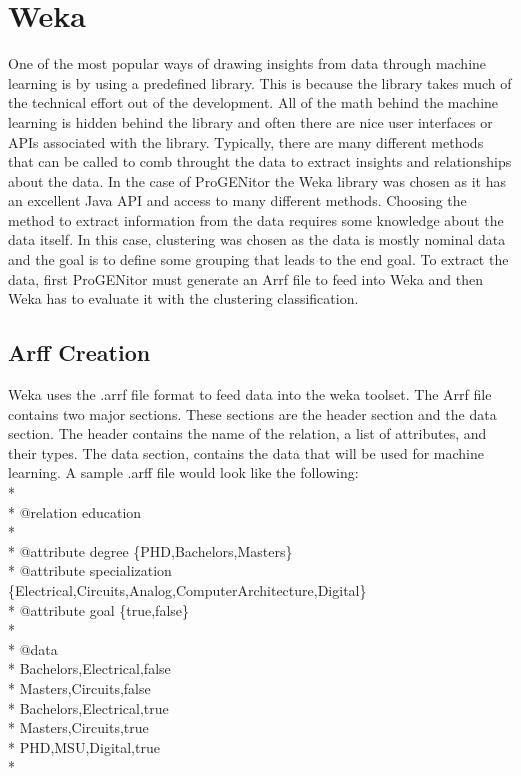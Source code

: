 \section{Weka}
\label{sect:weka}
One of the most popular ways of drawing insights from data through machine
learning is by using a predefined library.  This is because the library takes
much of the technical effort out of the development.  All of the math behind the
machine learning is hidden behind the library and often there are nice user
interfaces or APIs associated with the library.  Typically, there are many
different methods that can be called to comb throught the data to extract
insights and relationships about the data.  In the case of ProGENitor the Weka
library was chosen as it has an excellent Java API and access to many different
methods.  Choosing the method to extract information from the data requires some
knowledge about the data itself.  In this case, clustering was chosen as the
data is mostly nominal data and the goal is to define some grouping that leads
to the end goal.  To extract the data, first ProGENitor must generate an
Arrf file to feed into Weka and then Weka has to evaluate it with the clustering
classification.

\subsection{Arff Creation}
Weka uses the .arrf file format to feed data into the weka toolset.  The Arrf
file contains two major sections.  These sections are the header section and the
data section.\cite{arrf}  The header contains the name of the relation, a list
of attributes, and their types.  The data section, contains the data that will
be used for machine learning.  A sample .arff file would look like the
following:
\\*
\\*
@relation education\\*
\\*
@attribute degree \{PHD,Bachelors,Masters\}\\*
@attribute specialization
\{Electrical,Circuits,Analog,ComputerArchitecture,Digital\}\\* @attribute goal
\{true,false\}\\* \\* @data\\*
Bachelors,Electrical,false\\*
Masters,Circuits,false\\*
Bachelors,Electrical,true\\*
Masters,Circuits,true\\*
PHD,MSU,Digital,true\\*

